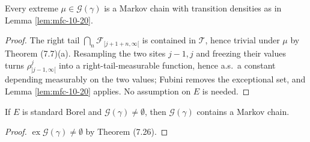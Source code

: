 \begin{theorem}[Georgii (10.21)]
    \label{thm:mfc-10-21}
    \leanok

    Every extreme $\mu \in \mathcal G(\gamma)$ is a Markov chain with transition densities as
    in Lemma \ref{lem:mfc-10-20}.
\end{theorem}
\begin{proof}
    \leanok
    The right tail $\bigcap_n \mathcal F_{[j+1+n,\infty[}$ is contained in $\mathcal T$, hence
    trivial under $\mu$ by Theorem (7.7)(a). Resampling the two sites $j-1, j$ and freezing their
    values turns $\rho^j_{]j-1,\infty[}$ into a right-tail-measurable function, hence a.s.\ a
    constant depending measurably on the two values; Fubini removes the exceptional set, and
    Lemma \ref{lem:mfc-10-20} applies. No assumption on $E$ is needed.
\end{proof}

\begin{corollary}[Georgii (10.22)]
    \label{cor:mfc-10-22}
    \leanok

    If $E$ is standard Borel and $\mathcal G(\gamma) \neq \emptyset$, then $\mathcal G(\gamma)$
    contains a Markov chain.
\end{corollary}
\begin{proof}
    \leanok
    $\operatorname{ex}\mathcal G(\gamma) \neq \emptyset$ by Theorem (7.26).
\end{proof}
